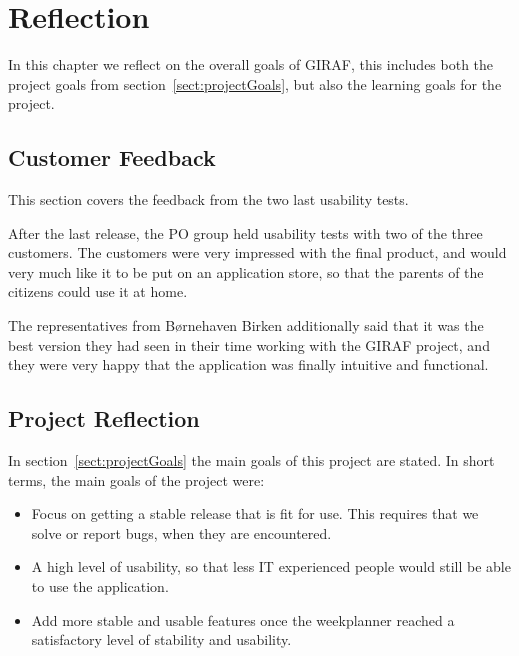 \chapter{Reflection}
In this chapter we reflect on the overall goals of GIRAF, this includes both the project goals from section~\ref{sect:projectGoals}, but also the learning goals for the project.

\section{Customer Feedback}\label{sect:customerFeedback}
This section covers the feedback from the two last usability tests.

After the last release, the PO group held usability tests with two of the three customers. The customers were very impressed with the final product, and would very much like it to be put on an application store, so that the parents of the citizens could use it at home.

The representatives from Børnehaven Birken additionally said that it was the best version they had seen in their time working with the GIRAF project, and they were very happy that the application was finally intuitive and functional.



\section{Project Reflection}
\label{sect:reflection}
In section~\ref{sect:projectGoals} the main goals of this project are stated. In short terms, the main goals of the project were:
\begin{itemize}
    \item Focus on getting a stable release that is fit for use. This requires that we solve or report bugs, when they are encountered.
    \item A high level of usability, so that less IT experienced people would still be able to use the application.
    \item Add more stable and usable features once the weekplanner reached a satisfactory level of stability and usability.
\end{itemize}

